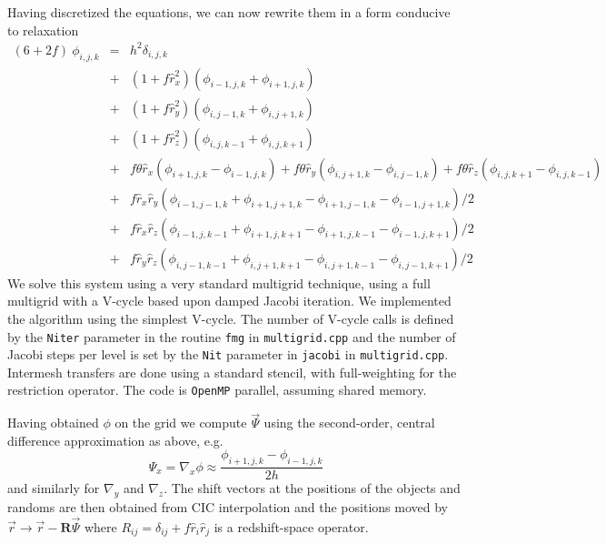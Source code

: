 \documentclass[a4paper,11pt]{article}
\begin{document}
Having discretized the equations, we can now rewrite them in a form
conducive to relaxation
\begin{eqnarray}
  (6+2f)\ \phi_{i,j,k} &=& h^2 \delta_{i,j,k} \nonumber \\
  &+&(1+f\hat{r}_x^2)\left( \phi_{i-1,j,k}+\phi_{i+1,j,k} \right) \nonumber \\
  &+&(1+f\hat{r}_y^2)\left( \phi_{i,j-1,k}+\phi_{i,j+1,k} \right) \nonumber \\
  &+&(1+f\hat{r}_z^2)\left( \phi_{i,j,k-1}+\phi_{i,j,k+1} \right) \nonumber \\
  &+&f\theta\hat{r}_x\left(\phi_{i+1,j,k}-\phi_{i-1,j,k}\right)
   + f\theta\hat{r}_y\left(\phi_{i,j+1,k}-\phi_{i,j-1,k}\right)
   + f\theta\hat{r}_z\left(\phi_{i,j,k+1}-\phi_{i,j,k-1}\right) \nonumber \\
  &+&f\hat{r}_x\hat{r}_y\left( \phi_{i-1,j-1,k}+\phi_{i+1,j+1,k}
                              -\phi_{i+1,j-1,k}-\phi_{i-1,j+1,k} \right)/2
      \nonumber \\
  &+&f\hat{r}_x\hat{r}_z\left( \phi_{i-1,j,k-1}+\phi_{i+1,j,k+1}
                              -\phi_{i+1,j,k-1}-\phi_{i-1,j,k+1} \right)/2
      \nonumber \\
  &+&f\hat{r}_y\hat{r}_z\left( \phi_{i,j-1,k-1}+\phi_{i,j+1,k+1}
                              -\phi_{i,j+1,k-1}-\phi_{i,j-1,k+1} \right)/2
\end{eqnarray}
We solve this system using a very standard multigrid technique, using a full
multigrid with a V-cycle based upon damped Jacobi iteration.
We implemented the algorithm using the simplest V-cycle.
The number of V-cycle calls is defined by the {\tt Niter} parameter in
the routine {\tt fmg} in {\tt multigrid.cpp} and the number of Jacobi
steps per level is set by the {\tt Nit} parameter in {\tt jacobi} in
{\tt multigrid.cpp}.
Intermesh transfers are done using a standard stencil, with full-weighting
for the restriction operator.
The code is {\tt OpenMP} parallel, assuming shared memory.

Having obtained $\phi$ on the grid we compute $\vec{\Psi}$ using the
second-order, central difference approximation as above, e.g.
\begin{equation}
  \Psi_x = \nabla_x\phi \approx \frac{\phi_{i+1,j,k}-\phi_{i-1,j,k}}{2h}
\end{equation}
and similarly for $\nabla_y$ and $\nabla_z$.  The shift vectors at the
positions of the objects and randoms are then obtained from CIC interpolation
and the positions moved by $\vec{r}\to\vec{r}-\mathbf{R}\vec{\Psi}$ where
$R_{ij}=\delta_{ij}+f\hat{r}_i\hat{r}_j$ is a redshift-space operator.



\end{document}
